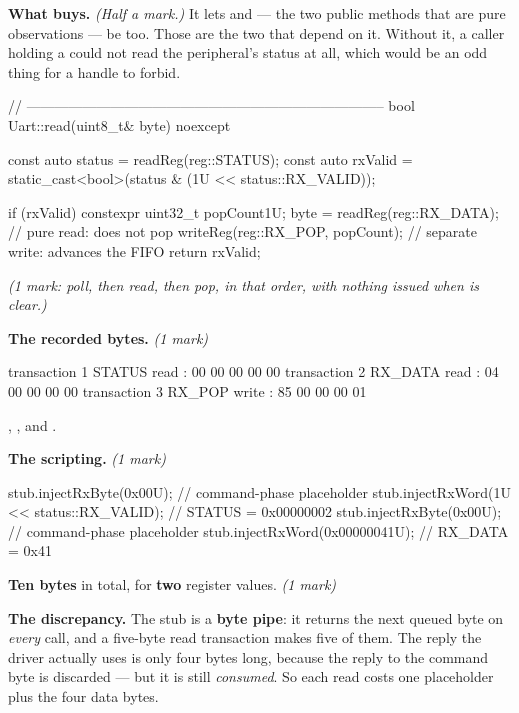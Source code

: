 \textbf{What  buys.} \textit{(Half a mark.)} It lets  and
 --- the two public methods that are pure observations --- be  too.
Those are the two that depend on it. Without it, a caller holding a  could not
read the peripheral's status at all, which would be an odd thing for a  handle to forbid.

\begin{cppcode}
// -----------------------------------------------------------------------------
bool Uart::read(uint8_t& byte) noexcept
{
    const auto status  = readReg(reg::STATUS);
    const auto rxValid = static_cast<bool>(status & (1U << status::RX_VALID));

    if (rxValid)
    {
        constexpr uint32_t popCount{1U};
        byte = readReg(reg::RX_DATA);        // pure read: does not pop
        writeReg(reg::RX_POP, popCount);     // separate write: advances the FIFO
    }
    return rxValid;
}
\end{cppcode}

{\itshape (1 mark: poll, then read, then pop, in that order, with nothing issued when
 is clear.)\par}

\medskip
\textbf{The recorded bytes.} \textit{(1 mark)}

\begin{console}
transaction 1  STATUS read    : 00 00 00 00 00
transaction 2  RX_DATA read   : 04 00 00 00 00
transaction 3  RX_POP write   : 85 00 00 00 01
\end{console}

\noindent{}, , and .

\textbf{The scripting.} \textit{(1 mark)}

\begin{cppcode}
stub.injectRxByte(0x00U);                    // command-phase placeholder
stub.injectRxWord(1U << status::RX_VALID);   // STATUS = 0x00000002
stub.injectRxByte(0x00U);                    // command-phase placeholder
stub.injectRxWord(0x00000041U);              // RX_DATA = 0x41
\end{cppcode}

\noindent\textbf{Ten bytes} in total, for \textbf{two} register values. \textit{(1 mark)}

\textbf{The discrepancy.} The stub is a \textbf{byte pipe}: it returns the next queued byte on
\emph{every}  call, and a five-byte read transaction makes five of them. The reply
the driver actually uses is only four bytes long, because the reply to the command byte is discarded
--- but it is still \emph{consumed}. So each read costs one placeholder plus the four data bytes.

